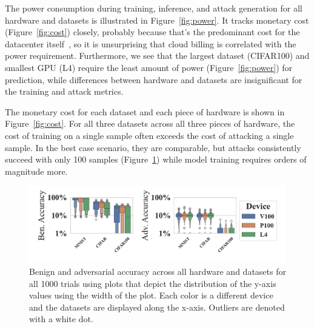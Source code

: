 \documentclass[sn-mathphys-num]{sn-jnl}%
\begin{document}
The power consumption during training, inference, and attack generation for all hardware and datasets is illustrated in Figure~\ref{fig:power}. It tracks monetary cost (Figure~\ref{fig:cost}) closely, probably because that's the predominant cost for the datacenter itself~\cite{dayarathna2015data}, so it is unsurprising that cloud billing is correlated with the power requirement. Furthermore, we see that the largest dataset (CIFAR100) and smallest GPU (L4) require the least amount of power (Figure~\ref{fig:power}) for prediction, while differences between hardware and datasets are insignificant for the training and attack metrics.

The monetary cost for each dataset and each piece of hardware is shown in Figure~\ref{fig:cost}. For all three datasets across all three pieces of hardware, the cost of training on a single sample often exceeds the cost of attacking a single sample. In the best case scenario, they are comparable, but attacks consistently succeed with only 100 samples (Figure~\ref{fig:acc}) while model training requires orders of magnitude more.
\begin{figure}[tph!]
    \centering
    \includegraphics[width=\textwidth]{plots/combined/acc.pdf}
    \caption{Benign and adversarial accuracy across all hardware and datasets for all 1000 trials using plots that depict the distribution of the y-axis values using the width of the plot. Each color is a different device and the datasets are displayed along the x-axis. Outliers are denoted with a white dot.}
    \label{fig:acc}
\end{figure}
\end{document}
